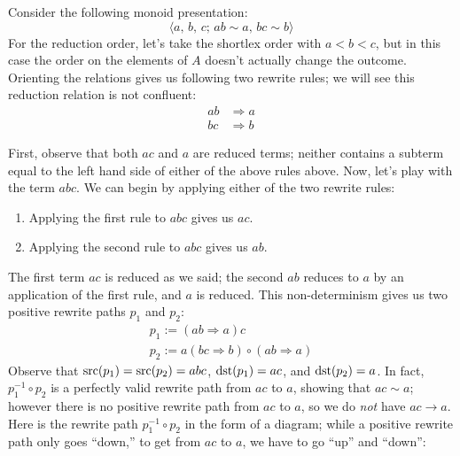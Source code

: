 \documentclass[../generics]{subfiles}
\begin{document}
\begin{example}\label{not confluent presentation}
Consider the following monoid presentation:
\[\langle a,\,b,\,c;\,ab\sim a,\,bc\sim b\rangle\]
For the reduction order, let's take the shortlex order with $a<b<c$, but in this case the order on the elements of $A$ doesn't actually change the outcome. Orienting the relations gives us following two rewrite rules; we will see this reduction relation is not confluent:
\begin{align*}
ab&\Rightarrow a\\
bc&\Rightarrow b
\end{align*}

%
First, observe that both $ac$ and $a$ are reduced terms; neither contains a subterm equal to the left hand side of either of the above rules above. Now, let's play with the term $abc$. We can begin by applying either of the two rewrite rules:
\begin{enumerate}
\item Applying the first rule to $abc$ gives us $ac$.
\item Applying the second rule to $abc$ gives us $ab$.
\end{enumerate}
The first term $ac$ is reduced as we said; the second $ab$ reduces to $a$ by an application of the first rule, and $a$ is reduced. This non-determinism gives us two positive rewrite paths $p_1$ and $p_2$:
\begin{gather*}
p_1 := (ab\Rightarrow a)c\\
p_2 := a(bc\Rightarrow b)\circ(ab\Rightarrow a)
\end{gather*}
%
Observe that $\operatorname{src}(p_1)=\operatorname{src}(p_2)=abc$, $\operatorname{dst}(p_1)=ac$, and $\operatorname{dst}(p_2)=a$. In fact, $p_1^{-1}\circ p_2$ is a perfectly valid rewrite path from $ac$ to $a$, showing that $ac\sim a$; however there is no positive rewrite path from $ac$ to $a$, so we do \emph{not} have $ac\rightarrow a$. Here is the rewrite path $p_1^{-1}\circ p_2$ in the form of a diagram; while a positive rewrite path only goes ``down,'' to get from $ac$ to $a$, we have to go ``up'' and ``down'':
\begin{quote}

\end{quote}
\end{example}
\end{document}
